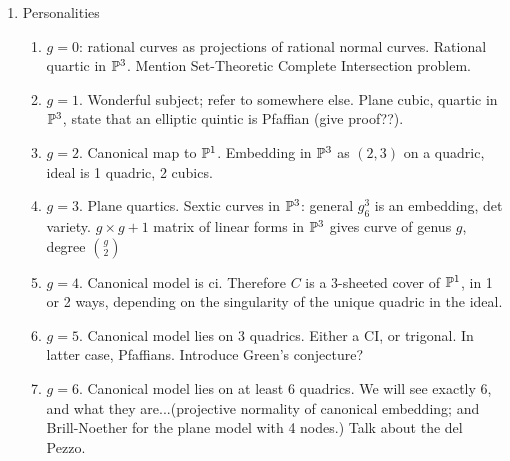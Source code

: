 \documentclass[12pt, leqno]{article}
\begin{document}
\begin{enumerate}
\item Personalities
\begin{enumerate}
\item $g=0$: rational curves as projections of rational normal curves. Rational quartic in ${\mathbb P}^3$. Mention Set-Theoretic Complete Intersection problem.
\item $g=1$. Wonderful subject; refer to somewhere else. Plane cubic, quartic in ${\mathbb P}^3$, state that an elliptic quintic is Pfaffian (give proof??).
\item $g=2$. Canonical map to ${\mathbb P}^1$. Embedding in ${\mathbb P}^3$ as $(2,3)$ on a quadric, ideal is 1 quadric, 2 cubics.
\item $g=3$. Plane quartics. Sextic curves in ${\mathbb P}^3$: general $g^3_6$ is an embedding, det variety.  $g\times g+1$ matrix of linear forms in ${\mathbb P}^3$ gives curve of genus $g$, degree ${g\choose 2}$
\item $g=4$. Canonical model is ci. Therefore $C$ is a 3-sheeted cover of ${\mathbb P}^1$, in 1 or 2 ways, depending on the singularity of the unique quadric in the ideal.
\item $g=5$. Canonical model lies on 3 quadrics. Either a CI, or trigonal. In latter case, Pfaffians. Introduce Green's conjecture?
\item $g=6$. Canonical model lies on at least 6 quadrics. We will see exactly 6, and what they are...(projective normality of canonical embedding; and Brill-Noether for the plane model with 4 nodes.) Talk about the del Pezzo.
\end{enumerate}


\end{enumerate}
\end{document}
